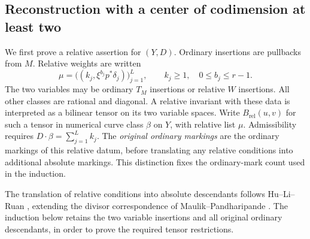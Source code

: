 \subsection{Reconstruction with a center of codimension at least two}

We first prove a relative assertion for $(Y,D)$.  Ordinary insertions are
pullbacks from $M$.  Relative weights are written
\begin{equation}\label{gw:relative-weights}
\mu=\bigl((k_j,\xi^{b_j}p^*\delta_j)\bigr)_{j=1}^{L},\qquad k_j\geq1,
       \quad0\leq b_j\leq r-1.
\end{equation}
The two variables may be ordinary $T_M$ insertions or relative $W$ insertions.
All other classes are rational and diagonal.  A relative invariant with
these data is interpreted as a bilinear tensor on its two variable spaces.
Write $B_{\mathrm{rel}}(u,v)$ for such a tensor in numerical curve class
$\beta$ on $Y$, with relative list $\mu$.  Admissibility requires
$D\cdot\beta=\sum_{j=1}^{L}k_j$.
The \emph{original ordinary markings} are the ordinary markings of this
relative datum, before translating any relative conditions into additional
absolute markings.  This distinction fixes the ordinary-mark count used
in the induction.

The translation of relative conditions into absolute descendants follows
Hu--Li--Ruan \cite[Section~5.2, equation~(17)]{HLR08}, extending the divisor
correspondence of Maulik--Pandharipande
\cite[Theorem~2 and Section~2.4]{MP06}.
The induction below retains the two variable insertions and all original
ordinary descendants, in order to prove the required tensor restrictions.

